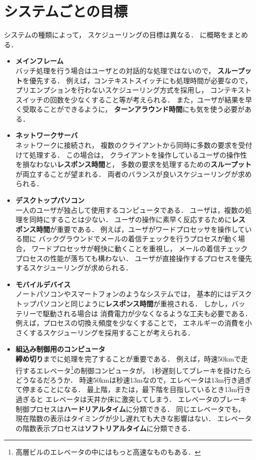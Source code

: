 \section{システムごとの目標}
システムの種類によって，
スケジューリングの目標は異なる．
に概略をまとめる．

\begin{itemize}
\item {\bf メインフレーム} \\
バッチ処理を行う場合はユーザとの対話的な処理ではないので，
{\bf スループット}を優先する．
例えば，コンテキストスイッチにも処理時間が必要なので，
プリエンプションを行わないスケジューリング方式を採用し，
コンテキストスイッチの回数を少なくすること等が考えられる．
また，ユーザが結果を早く受取ることができるように，
{\bf ターンアラウンド時間}にも気を使う必要がある．

\item {\bf ネットワークサーバ} \\
ネットワークに接続され，
複数のクライアントから同時に多数の要求を受付けて処理する．
この場合は，
クライアントを操作しているユーザの操作性を損なわない{\bf レスポンス時間}と，
多数の要求を処理するための{\bf スループット}が両立することが望まれる．
両者のバランスが良いスケジューリングが求められる．

\item {\bf デスクトップパソコン} \\
一人のユーザが独占して使用するコンピュータである．
ユーザは，複数の処理を同時にすることは少ない．
ユーザの操作に素早く反応するために{\bf レスポンス時間}が重要である．
例えば，ユーザがワードプロセッサを操作している間に
バックグラウンドでメールの着信チェックを行うプロセスが動く場合，
ワードプロセッサが軽快に動くことを重視し，
メールの着信チェックプロセスの性能が落ちても構わない．
ユーザが直接操作するプロセスを優先するスケジューリングが求められる．

\item {\bf モバイルデバイス} \\
ノートパソコンやスマートフォンのようなシステムでは，
基本的にはデスクトップパソコンと同じように{\bf レスポンス時間}が重視される．
しかし，バッテリーで駆動される場合は
消費電力が少なくなるような工夫も必要である．
例えば，プロセスの切換え頻度を少なくすることで，
エネルギーの消費を小さくするスケジューリングを採用することが考えられる．

\item {\bf 組込み制御用のコンピュータ} \\
{\bf 締め切り}までに処理を完了することが重要である．
例えば，時速50kmで走行するエレベータ\footnote{
高層ビルのエレベータの中にはもっと高速なものもある．
}の制御コンピュータが，
1秒遅刻してブレーキを掛けたらどうなるだろうか．
時速50kmは秒速13mなので，エレベータは13m行き過ぎて停まることになる．
最上階，または，最下階を目指しているとき13m行き過ぎると
エレベータは天井か床に激突してしまう．
エレベータのブレーキ制御プロセスは{\bf ハードリアルタイム}に分類できる．
同じエレベータでも，
現在階数の表示はタイミングが少し遅れても大きな影響はない．
エレベータの階数表示プロセスは{\bf ソフトリアルタイム}に分類できる．
\end{itemize}

